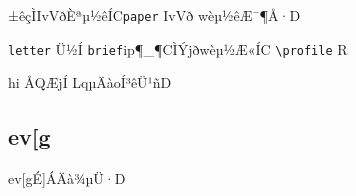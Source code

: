 \documentclass[paper]{ieice}
\begin{document}
{±êçÌIvVðÈªµ½êÍC\texttt{paper} IvVð
wèµ½êÆ¯¶Å·D


\texttt{letter} Ü½Í \texttt{brief}ip¶_¶CÌÝjðwèµ½Æ«ÍC
\verb/\profile/ R}hi\pageref{profile:command} ÅQÆjÍ
LqµÄàoÍ³êÜ¹ñD

\subsection{ev[g}

ev[gÉ]ÁÄà¾µÜ·D

\end{document}
